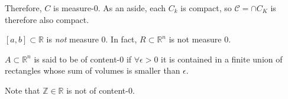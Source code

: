 \documentclass{article}
\begin{document}
Therefore, $C$ is measure-$0$. As an aside, each $C_k$ is compact, so $\mathcal{C} = \cap C_K$ is therefore also compact.
\begin{theorem}
    $[a,b] \subset \mathbb{R}$ is \textit{not} measure $0$. In fact, $R \subset \mathbb{R}^n$ is not measure $0$.
\end{theorem}
\begin{definition}
    $A\subset \mathbb{R}^n$ is said to be of content-$0$ if $\forall \epsilon > 0$ it is contained in a finite union of rectangles whose sum of volumes is smaller than $\epsilon$.
\end{definition}
Note that $\mathbb{Z} \in \mathbb{R}$ is not of content-$0$.
\end{document}
